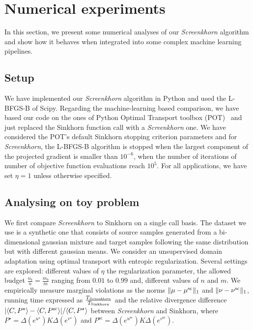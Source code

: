 
\section{Numerical experiments} %
\label{sec:numerical_experiments}

In this section, we present some numerical analyses of our
\emph{Screenkhorn} algorithm and show how it behaves when
integrated into some complex machine learning pipelines.

\subsection{Setup}

We have implemented our \emph{Screenkhorn} algorithm in Python and used the L-BFGS-B of
Scipy. Regarding the machine-learning based comparison, we have based our code
on the ones of Python Optimal Transport toolbox (POT)~\citep{flamary2017pot} and just replaced the Sinkhorn function call with a \emph{Screenkhorn} one. We have considered the POT's default Sinkhorn stopping criterion parameters and for \emph{Screenkhorn}, the L-BFGS-B algorithm is stopped when the 
largest component of the projected gradient is smaller than $10^{-6}$, when the number of iterations of number of objective function evaluations reach $10^{5}$. For all applications, we have set $\eta=1$ unless otherwise specified.

\subsection{Analysing on toy problem}

We first compare \emph{Screenkhorn} to Sinkhorn on  a single call basis. The dataset we use is a synthetic one that consists of source samples generated from a bi-dimensional gaussian mixture and target samples following the same distribution but with different gaussian means. We consider an unsupervised domain adaptation using optimal transport with entropic regularization.  Several settings are explored: different values of $\eta$ the regularization parameter, the allowed budget $\frac{n_b}{n} = \frac{m_b}{m}$ ranging from $0.01$ to $0.99$ and, different values of $n$ and $m$.
 We empirically measure  marginal violations as the norms $\|{\mu} -{\mu}^{\text{sc}}\|_1$ and $\|{\nu} -{\nu}^{\text{sc}}\|_1$, running time expressed as $\frac{T_{\text{\emph{Screenkhorn}}}}{T_{\text{Sinkhorn}}}$ and the relative divergence difference $| \langle C, P^\star \rangle - \langle C, P^{\text{sc}} \rangle|/\langle C, P^\star \rangle$ between \emph{Screenkhorn} and Sinkhorn, where $P^\star = \Delta(e^{u^\star}) K \Delta(e^{v^\star})$ and $P^{\text{sc}} = \Delta(e^{u^{\text{sc}}}) K \Delta(e^{v^{\text{sc}}}).$

